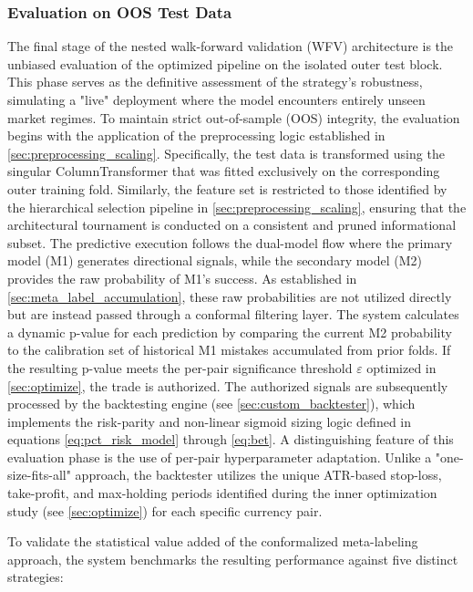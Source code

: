 \documentclass[12pt, a4paper]{article}
\begin{document}
\subsubsection{Evaluation on OOS Test Data}\label{sec:oos_evaluation}

The final stage of the nested walk-forward validation (WFV) architecture is the unbiased evaluation of the optimized pipeline on the isolated outer test block. 
This phase serves as the definitive assessment of the strategy's robustness, simulating a "live" deployment where the model encounters entirely unseen market regimes.
To maintain strict out-of-sample (OOS) integrity, the evaluation begins with the application of the preprocessing logic established in \ref{sec:preprocessing_scaling}. 
Specifically, the test data is transformed using the singular ColumnTransformer that was fitted exclusively on the corresponding outer training fold. 
Similarly, the feature set is restricted to those identified by the hierarchical selection pipeline in \ref{sec:preprocessing_scaling}, ensuring that the architectural tournament 
is conducted on a consistent and pruned informational subset.
The predictive execution follows the dual-model flow where the primary model (M1) generates directional signals, while the secondary model (M2) provides the raw probability of M1's success. 
As established in \ref{sec:meta_label_accumulation}, these raw probabilities are not utilized directly but are instead passed through a conformal filtering layer. 
The system calculates a dynamic p-value for each prediction by comparing the current M2 probability to the calibration set of historical M1 mistakes accumulated from prior folds. 
If the resulting p-value meets the per-pair significance threshold \( \varepsilon \) optimized in \ref{sec:optimize}, the trade is authorized.
The authorized signals are subsequently processed by the backtesting engine (see \ref{sec:custom_backtester}), which implements the risk-parity and non-linear sigmoid sizing logic 
defined in equations \ref{eq:pct_risk_model} through \ref{eq:bet}. A distinguishing feature of this evaluation phase is the use of per-pair hyperparameter adaptation. 
Unlike a "one-size-fits-all" approach, the backtester utilizes the unique ATR-based stop-loss, take-profit, and max-holding periods identified during the inner optimization study 
(see \ref{sec:optimize}) for each specific currency pair.

\medskip

To validate the statistical value added of the conformalized meta-labeling approach, the system benchmarks the resulting performance against five distinct strategies:
\end{document}
